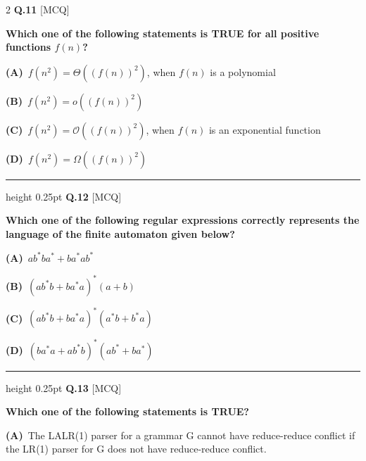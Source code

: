 \documentclass[a4paper,10pt,twoside]{article}
\begin{document}
\begin{multicols}{2}
\noindent\textbf{Q.11} \hfill {\footnotesize\textsf{[MCQ]}}
\par\vspace{2pt}
{\bfseries Which one of the following statements is TRUE for all positive functions $f(n)$? \par}
\par\vspace{2pt}\noindent
\textbf{(A)}~$f(n^2) = \Theta((f(n))^2)$, when $f(n)$ is a polynomial\par\vspace{2pt}\noindent
\textbf{(B)}~$f(n^2) = o((f(n))^2)$\par\vspace{2pt}\noindent
\textbf{(C)}~$f(n^2) = \mathcal{O}((f(n))^2)$, when $f(n)$ is an exponential function\par\vspace{2pt}\noindent
\textbf{(D)}~$f(n^2) = \Omega((f(n))^2)$
\par\vspace{6pt}\hrule height 0.25pt\vspace{6pt}
\noindent\textbf{Q.12} \hfill {\footnotesize\textsf{[MCQ]}}
\par\vspace{2pt}
{\bfseries Which one of the following regular expressions correctly represents the language of the finite automaton given below? \par}
\par\vspace{2pt}\noindent
\textbf{(A)}~$ab^*ba^* + ba^*ab^*$\par\vspace{2pt}\noindent
\textbf{(B)}~$(ab^*b + ba^*a)^*(a + b)$\par\vspace{2pt}\noindent
\textbf{(C)}~$(ab^*b + ba^*a)^*(a^*b + b^*a)$\par\vspace{2pt}\noindent
\textbf{(D)}~$(ba^*a + ab^*b)^*(ab^* + ba^*)$
\par\vspace{6pt}\hrule height 0.25pt\vspace{6pt}
\noindent\textbf{Q.13} \hfill {\footnotesize\textsf{[MCQ]}}
\par\vspace{2pt}
{\bfseries Which one of the following statements is TRUE? \par}
\par\vspace{2pt}\noindent
\textbf{(A)}~The LALR(1) parser for a grammar G cannot have reduce-reduce conflict if the LR(1) parser for G does not have reduce-reduce conflict.\par\vspace{2pt}\noindent

\end{multicols}
\end{document}
